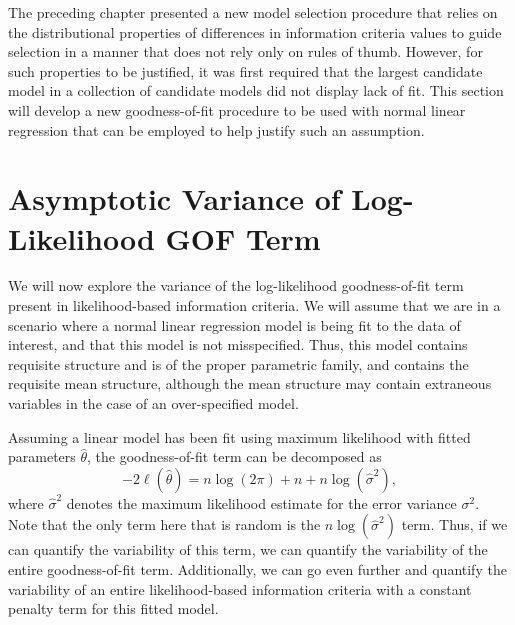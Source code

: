 \doublespace
{}

	The preceding chapter presented a new model selection procedure that relies on the distributional properties of differences in information criteria values to guide
	selection in a manner that does not rely only on rules of thumb. However, for such properties to be justified, it was first required that the largest candidate model
	in a collection of candidate models did not display lack of fit. This section will develop a new goodness-of-fit procedure to be used with normal linear regression
	that can be employed to help justify such an assumption.
		
		\section{Asymptotic Variance of Log-Likelihood GOF Term} \label{sec:asymp_var}

		We will now explore the variance of the log-likelihood goodness-of-fit term present in likelihood-based information criteria. We will assume that we are in a
		scenario where a normal linear regression model is being fit to the data of interest, and that this model is not misspecified. Thus, this model contains requisite
		structure and is of the proper parametric family, and contains the requisite mean structure, although the mean structure may contain extraneous variables in the
		case of an over-specified model.

		Assuming a linear model has been fit using maximum likelihood with fitted parameters $\hat{\theta}$, the goodness-of-fit term can be decomposed as
		\begin{equation}
			-2 \ell (\hat{\theta}  ) = n \log(2 \pi) + n + n \log(\hat{\sigma}^2 ) ,
		\end{equation}
		where $\hat{\sigma}^2$ denotes the maximum likelihood estimate for the error variance $\sigma^2$. Note that the only term here that is random is
		the $n \log(\hat{\sigma}^2)$ term. Thus, if we can quantify the variability of this term, we can quantify the variability of the entire goodness-of-fit
		term. Additionally, we can go even further and quantify the variability of an entire likelihood-based information criteria with a constant penalty
		term for this fitted model.


